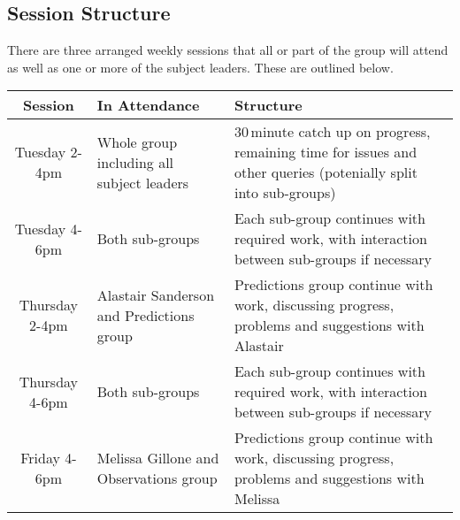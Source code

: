 \subsection{Session Structure} %
\label{sub:session_structure}
There are three arranged weekly sessions that all or part of the group will attend as well as one or more of the subject leaders. These are outlined below.
\begin{table}[ht]
	\centering
	\begin{tabular}{c|p{10em}|p{20em}}
		Session	& In Attendance	& Structure \\
		\hline\hline
		Tuesday 2-4pm & Whole group including all subject leaders	& 30\,minute catch up on progress, remaining time for issues and other queries (potenially split into sub-groups) \\[0.8em]
		Tuesday 4-6pm &Both sub-groups& Each sub-group continues with required work, with interaction between sub-groups if necessary  \\[0.8em]
		Thursday 2-4pm &Alastair Sanderson and Predictions group& Predictions group continue with work, discussing progress, problems and suggestions with Alastair \\[0.8em]
		Thursday 4-6pm &Both sub-groups& Each sub-group continues with required work, with interaction between sub-groups if necessary \\[0.8em]
		Friday 4-6pm &Melissa Gillone and Observations group& Predictions group continue with work, discussing progress, problems and suggestions with Melissa
	\end{tabular}	
\end{table}

